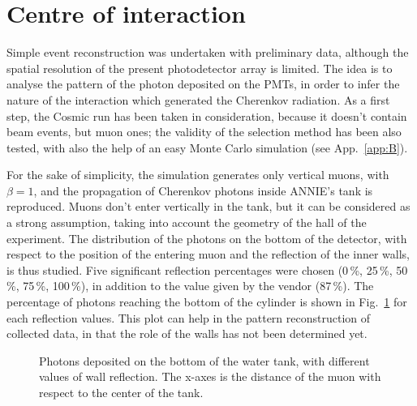 \section{Centre of interaction}

 Simple event reconstruction was undertaken with preliminary data, although the spatial resolution of the %
 present photodetector array is limited.
 The idea is to analyse the pattern of the photon deposited on the PMTs, in order to infer the nature of %
 the interaction which generated the Cherenkov radiation.
 As a first step, the Cosmic run has been taken in consideration, because it doesn't contain beam events, %
 but muon ones; the validity of the selection method has been also tested, with also the help of an easy %
 Monte Carlo simulation (see App.~\ref{app:B}).

 For the sake of simplicity, the simulation generates only vertical muons, with $\beta = 1$, and %
 the propagation of Cherenkov photons inside ANNIE's tank is reproduced.
 Muons don't enter vertically in the tank, but it can be considered as a strong assumption, %
 taking into account the geometry of the hall of the experiment.
 The distribution of the photons on the bottom of the detector, with respect to the position of the %
 entering muon and the reflection of the inner walls, is thus studied.
 Five significant reflection percentages were chosen (0\,\%, 25\,\%, 50\,\%, 75\,\%, 100\,\%), %
 in addition to the value given by the vendor (87\,\%).
 The percentage of photons reaching the bottom of the cylinder is shown in Fig.~\ref{fig:reflect} %
 for each reflection values.
 This plot can help in the pattern reconstruction of collected data, in that the role of the walls has not %
 been determined yet.

\begin{figure}
  \centering
   \hfill 
    \caption{Photons deposited on the bottom of the water tank, with different values of wall reflection.
    The x-axes is the distance of the muon with respect to the center of the tank.}
  \label{fig:reflect}
\end{figure}

